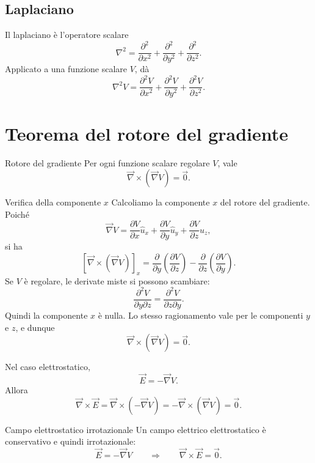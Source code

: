 \documentclass[a4paper]{article}
\begin{document}
\subsection{Laplaciano}

Il laplaciano è l'operatore scalare
\[
    \nabla^2=\frac{\partial^2}{\partial x^2}+\frac{\partial^2}{\partial y^2}+\frac{\partial^2}{\partial z^2}.
\]
Applicato a una funzione scalare \(V\), dà
\[
    \nabla^2V=\frac{\partial^2V}{\partial x^2}+\frac{\partial^2V}{\partial y^2}+\frac{\partial^2V}{\partial z^2}.
\]

\section{Teorema del rotore del gradiente}

\begin{snippettheorem}{Rotore del gradiente}
    Per ogni funzione scalare regolare \(V\), vale
    \[
        \vec{\nabla}\times\left(\vec{\nabla}V\right)=\vec{0}.
    \]
\end{snippettheorem}

\begin{snippetproof}{Verifica della componente \(x\)}
    Calcoliamo la componente \(x\) del rotore del gradiente. Poiché
    \[
        \vec{\nabla}V=\frac{\partial V}{\partial x}\hat{u}_x+\frac{\partial V}{\partial y}\hat{u}_y+\frac{\partial V}{\partial z}\hat{u}_z,
    \]
    si ha
    \[
        \left[\vec{\nabla}\times\left(\vec{\nabla}V\right)\right]_x
        =\frac{\partial}{\partial y}\left(\frac{\partial V}{\partial z}\right)
        -\frac{\partial}{\partial z}\left(\frac{\partial V}{\partial y}\right).
    \]
    Se \(V\) è regolare, le derivate miste si possono scambiare:
    \[
        \frac{\partial^2V}{\partial y\partial z}
        =\frac{\partial^2V}{\partial z\partial y}.
    \]
    Quindi la componente \(x\) è nulla. Lo stesso ragionamento vale per le componenti \(y\) e \(z\), e dunque
    \[
        \vec{\nabla}\times\left(\vec{\nabla}V\right)=\vec{0}.
    \]
\end{snippetproof}

Nel caso elettrostatico,
\[
    \vec{E}=-\vec{\nabla}V.
\]
Allora
\[
    \vec{\nabla}\times\vec{E}
    =\vec{\nabla}\times\left(-\vec{\nabla}V\right)
    =-\vec{\nabla}\times\left(\vec{\nabla}V\right)=\vec{0}.
\]

\begin{snippetproposition}{Campo elettrostatico irrotazionale}
    Un campo elettrico elettrostatico è conservativo e quindi irrotazionale:
    \[
        \vec{E}=-\vec{\nabla}V
        \qquad\Longrightarrow\qquad
        \vec{\nabla}\times\vec{E}=\vec{0}.
    \]
\end{snippetproposition}
\end{document}
